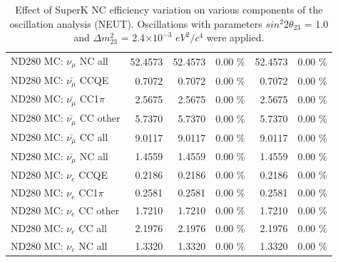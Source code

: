 \begin{table}
\begin{tabular}{| l | r | r  r | r  r |}
                                          ND280 MC: $\nu_{\mu}$ NC all &         52.4573 &         52.4573 &  0.00 \%  &         52.4573 &  0.00 \%  \\ 
                                      ND280 MC: $\bar{\nu_{\mu}}$ CCQE &          0.7072 &          0.7072 &  0.00 \%  &          0.7072 &  0.00 \%  \\ 
                                  ND280 MC: $\bar{\nu_{\mu}}$ CC1$\pi$ &          2.5675 &          2.5675 &  0.00 \%  &          2.5675 &  0.00 \%  \\ 
                                  ND280 MC: $\bar{\nu_{\mu}}$ CC other &          5.7370 &          5.7370 &  0.00 \%  &          5.7370 &  0.00 \%  \\ 
                                    ND280 MC: $\bar{\nu_{\mu}}$ CC all &          9.0117 &          9.0117 &  0.00 \%  &          9.0117 &  0.00 \%  \\ 
                                    ND280 MC: $\bar{\nu_{\mu}}$ NC all &          1.4559 &          1.4559 &  0.00 \%  &          1.4559 &  0.00 \%  \\ 
                                              ND280 MC: $\nu_{e}$ CCQE &          0.2186 &          0.2186 &  0.00 \%  &          0.2186 &  0.00 \%  \\ 
                                          ND280 MC: $\nu_{e}$ CC1$\pi$ &          0.2581 &          0.2581 &  0.00 \%  &          0.2581 &  0.00 \%  \\ 
                                          ND280 MC: $\nu_{e}$ CC other &          1.7210 &          1.7210 &  0.00 \%  &          1.7210 &  0.00 \%  \\ 
                                            ND280 MC: $\nu_{e}$ CC all &          2.1976 &          2.1976 &  0.00 \%  &          2.1976 &  0.00 \%  \\ 
                                            ND280 MC: $\nu_{e}$ NC all &          1.3320 &          1.3320 &  0.00 \%  &          1.3320 &  0.00 \%  \\ 
\hline
\end{tabular}
\caption{ 
  Effect of SuperK NC efficiency variation
  on various components of the oscillation analysis (NEUT).
  Oscillations with parameters $sin^{2}2\theta_{23}$ = 1.0 and $\Delta m^{2}_{23}$ = 2.4$\times10^{-3}$ $eV^{2}/c^{4}$ were applied.  
}
\label{tab:neut_sk_nc_eff}
\end{table}

%
%
%
%

